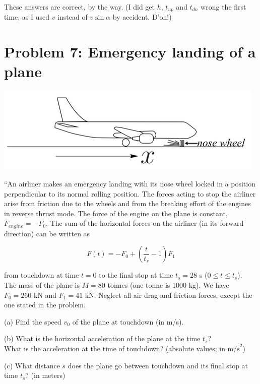 \documentclass[8.01x]{subfiles}
\begin{document}
These answers are correct, by the way. (I did get $h$, $t_{up}$ and $t_{dn}$ wrong the first time, as I used $v$ instead of $v \sin \alpha$ by accident. D'oh!)

\section{Problem 7: Emergency landing of a plane}

\begin{center}
\includegraphics[scale=0.7]{Graphics/midterm2p7}
\end{center}

``An airliner makes an emergency landing with its nose wheel locked in a position perpendicular to its normal rolling position. The forces acting to stop the airliner arise from friction due to the wheels and from the breaking effort of the engines in reverse thrust mode. The force of the engine on the plane is constant, $F_{engine} = -F_0$. The sum of the horizontal forces on the airliner (in its forward direction) can be written as

\begin{equation}
F(t) = - F_0 + \left( \frac{t}{t_s} - 1\right) F_1
\end{equation}

from touchdown at time $t = 0$ to the final stop at time $t_s = 28$ s ($0 \le t \le t_s$).\\
The mass of the plane is $M = 80$ tonnes (one tonne is 1000 kg). We have $F_0 = 260$ kN and $F_1 = 41$ kN. Neglect all air drag and friction forces, except the one stated in the problem.

(a) Find the speed $v_0$ of the plane at touchdown (in m/s).

(b) What is the horizontal acceleration of the plane at the time $t_s$?\\
What is the acceleration at the time of touchdown? (absolute values; in $\text{m/s}^2$)

(c) What distance $s$ does the plane go between touchdown and its final stop at time $t_s$? (in meters)
\end{document}
